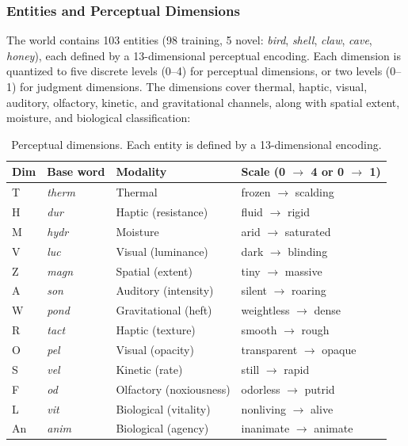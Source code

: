 \documentclass{article}
\begin{document}
\subsubsection{Entities and Perceptual Dimensions}

The world contains 103 entities (98 training, 5 novel: \textit{bird}, \textit{shell}, \textit{claw}, \textit{cave}, \textit{honey}), each defined by a 13-dimensional perceptual encoding. Each dimension is quantized to five discrete levels (0--4) for perceptual dimensions, or two levels (0--1) for judgment dimensions. The dimensions cover thermal, haptic, visual, auditory, olfactory, kinetic, and gravitational channels, along with spatial extent, moisture, and biological classification:

\begin{table}[htbp]
\centering
\small
\begin{tabular}{llll}
\toprule
Dim & Base word & Modality & Scale (0 $\rightarrow$ 4 or 0 $\rightarrow$ 1) \\
\midrule
T & \textit{therm} & Thermal & frozen $\rightarrow$ scalding \\
H & \textit{dur} & Haptic (resistance) & fluid $\rightarrow$ rigid \\
M & \textit{hydr} & Moisture & arid $\rightarrow$ saturated \\
V & \textit{luc} & Visual (luminance) & dark $\rightarrow$ blinding \\
Z & \textit{magn} & Spatial (extent) & tiny $\rightarrow$ massive \\
A & \textit{son} & Auditory (intensity) & silent $\rightarrow$ roaring \\
W & \textit{pond} & Gravitational (heft) & weightless $\rightarrow$ dense \\
R & \textit{tact} & Haptic (texture) & smooth $\rightarrow$ rough \\
O & \textit{pel} & Visual (opacity) & transparent $\rightarrow$ opaque \\
S & \textit{vel} & Kinetic (rate) & still $\rightarrow$ rapid \\
F & \textit{od} & Olfactory (noxiousness) & odorless $\rightarrow$ putrid \\
L & \textit{vit} & Biological (vitality) & nonliving $\rightarrow$ alive \\
An & \textit{anim} & Biological (agency) & inanimate $\rightarrow$ animate \\
\bottomrule
\end{tabular}
\caption{Perceptual dimensions. Each entity is defined by a 13-dimensional encoding.}
\label{tab:dims}
\end{table}
\end{document}
